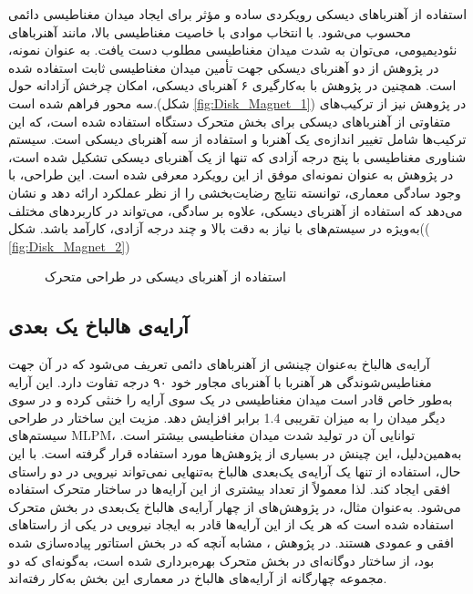 استفاده از آهنرباهای دیسکی رویکردی ساده و مؤثر برای ایجاد میدان مغناطیسی دائمی محسوب می‌شود. با انتخاب موادی با خاصیت مغناطیسی بالا، مانند آهنرباهای نئودیمیومی، می‌توان به شدت میدان مغناطیسی مطلوب دست یافت. به عنوان نمونه، در پژوهش 
\cite{RN7}
 از دو آهنربای دیسکی جهت تأمین میدان مغناطیسی ثابت استفاده شده است. همچنین در پژوهش 
\cite{RN39}
 با به‌کارگیری ۶ آهنربای دیسکی، امکان چرخش آزادانه حول سه محور فراهم شده است.(شکل
\ref{fig:Disk_Magnet_1})
 در پژوهش 
\cite{RN8}
 نیز از ترکیب‌های متفاوتی از آهنرباهای دیسکی برای بخش متحرک دستگاه استفاده شده است، که این ترکیب‌ها شامل تغییر اندازه‌ی یک آهنربا و استفاده از سه آهنربای دیسکی است. سیستم شناوری مغناطیسی با پنج درجه آزادی که تنها از یک آهنربای دیسکی تشکیل شده است، در پژوهش 
\cite{RN62}
 به عنوان نمونه‌ای موفق از این رویکرد معرفی شده است. این طراحی، با وجود سادگی معماری، توانسته نتایج رضایت‌بخشی را از نظر عملکرد ارائه دهد و نشان می‌دهد که استفاده از آهنربای دیسکی، علاوه بر سادگی، می‌تواند در کاربردهای مختلف به‌ویژه در سیستم‌های با نیاز به دقت بالا و چند درجه آزادی، کارآمد باشد. شکل((
\ref{fig:Disk_Magnet_2})


\begin{figure}[ht]
\centering 
{}
%
\caption{استفاده از آهنربای دیسکی در طراحی متحرک}
\label{fig:Disk_Magnet} %
\end{figure}



\subsection{آرایه‌ی هالباخ یک بعدی}

آرایه‌ی هالباخ
 به‌عنوان چینشی از آهنرباهای دائمی تعریف می‌شود که در آن جهت مغناطیس‌شوندگی هر آهنربا با آهنربای مجاور خود ۹۰ درجه تفاوت دارد. این آرایه به‌طور خاص قادر است میدان مغناطیسی در یک سوی آرایه را خنثی کرده و در سوی دیگر میدان را به میزان تقریبی 1.4 برابر افزایش دهد.
مزیت این ساختار در طراحی سیستم‌های MLPM، توانایی آن در تولید شدت میدان مغناطیسی بیشتر است. به‌همین‌دلیل، این چینش در بسیاری از پژوهش‌ها مورد استفاده قرار گرفته است.
با این حال، استفاده از تنها یک آرایه‌ی یک‌بعدی هالباخ به‌تنهایی نمی‌تواند نیرویی در دو راستای افقی ایجاد کند. لذا معمولاً از تعداد بیشتری از این آرایه‌ها در ساختار متحرک استفاده می‌شود. به‌عنوان مثال، در پژوهش‌های 
\cite{RN24,RN27}
 از چهار آرایه‌ی هالباخ یک‌بعدی در بخش متحرک استفاده شده است که هر یک از این آرایه‌ها قادر به ایجاد نیرویی در یکی از راستاهای افقی و عمودی هستند.
در پژوهش 
\cite{RN39}
، مشابه آنچه که در بخش استاتور پیاده‌سازی شده بود، از ساختار دوگانه‌ای در بخش متحرک بهره‌برداری شده است، به‌گونه‌ای که دو مجموعه چهارگانه از آرایه‌های هالباخ در معماری این بخش به‌کار رفته‌اند.

